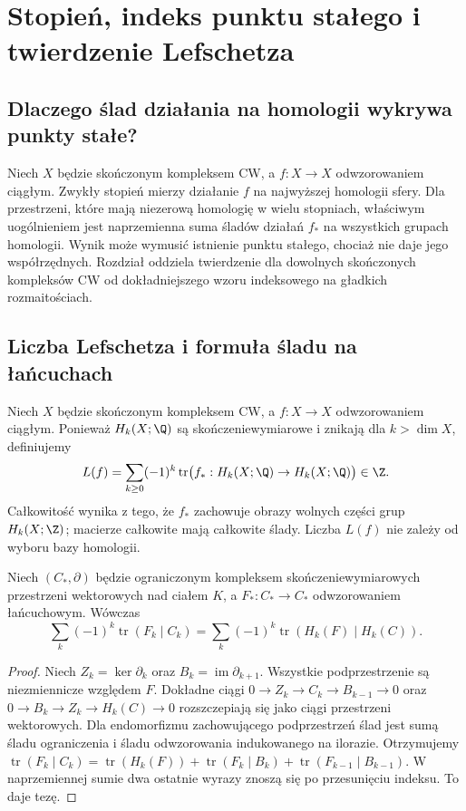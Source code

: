 \chapter{Stopień, indeks punktu stałego i twierdzenie Lefschetza}
\label{ch:lefschetz-v10}

\section{Dlaczego ślad działania na homologii wykrywa punkty stałe?}
Niech $X$ będzie skończonym kompleksem CW, a $f:X\to X$
odwzorowaniem ciągłym. Zwykły stopień mierzy działanie
$f$ na najwyższej homologii sfery. Dla przestrzeni, które
mają niezerową homologię w wielu stopniach, właściwym
uogólnieniem jest naprzemienna suma śladów działań
$f_*$ na wszystkich grupach homologii. Wynik może wymusić
istnienie punktu stałego, chociaż nie daje jego współrzędnych.
Rozdział oddziela twierdzenie dla dowolnych skończonych
kompleksów CW od dokładniejszego wzoru indeksowego na
gładkich rozmaitościach.

\section{Liczba Lefschetza i formuła śladu na łańcuchach}
\begin{definicja}
Niech $X$ będzie skończonym kompleksem CW, a $f:X\to X$
odwzorowaniem ciągłym. Ponieważ $H_k(X;\Q)$ są
skończeniewymiarowe i znikają dla $k>\dim X$, definiujemy
\[
 L(f)=\sum_{k\ge0}(-1)^k\operatorname{tr}
 \bigl(f_*:H_k(X;\Q)\to H_k(X;\Q)\bigr)\in\Z.
\]
Całkowitość wynika z tego, że $f_*$ zachowuje obrazy
wolnych części grup $H_k(X;\Z)$; macierze całkowite
mają całkowite ślady. Liczba $L(f)$ nie zależy od
wyboru bazy homologii.
\end{definicja}

\begin{lemat}
\label{lem:hopf-trace-v10}
Niech $(C_*,\partial)$ będzie ograniczonym kompleksem
skończeniewymiarowych przestrzeni wektorowych nad ciałem
$K$, a $F_*:C_*\to C_*$ odwzorowaniem łańcuchowym.
Wówczas
\[
 \sum_k(-1)^k\operatorname{tr}(F_k\mid C_k)
 =\sum_k(-1)^k\operatorname{tr}(H_k(F)\mid H_k(C)).
\]
\end{lemat}
\begin{proof}
Niech $Z_k=\ker\partial_k$ oraz $B_k=\operatorname{im}\partial_{k+1}$.
Wszystkie podprzestrzenie są niezmiennicze względem $F$.
Dokładne ciągi
$0\to Z_k\to C_k\to B_{k-1}\to0$ oraz
$0\to B_k\to Z_k\to H_k(C)\to0$
rozszczepiają się jako ciągi przestrzeni wektorowych.
Dla endomorfizmu zachowującego podprzestrzeń ślad jest
sumą śladu ograniczenia i śladu odwzorowania indukowanego
na ilorazie. Otrzymujemy
$\operatorname{tr}(F_k\mid C_k)=
 \operatorname{tr}(H_k(F))+
 \operatorname{tr}(F_k\mid B_k)+
 \operatorname{tr}(F_{k-1}\mid B_{k-1})$.
W naprzemiennej sumie dwa ostatnie wyrazy znoszą się
po przesunięciu indeksu. To daje tezę.
\end{proof}

